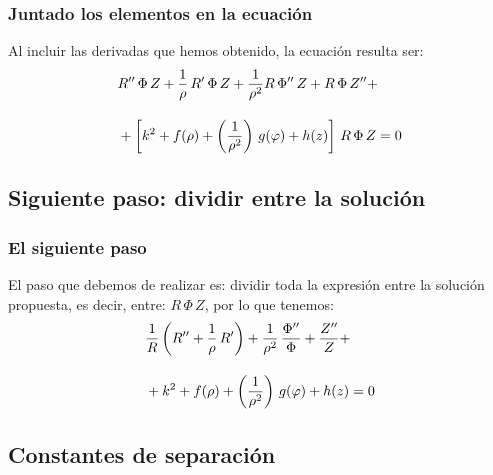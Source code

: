 \documentclass[12pt]{beamer}
\begin{document}
\begin{frame}
\frametitle{Juntado los elementos en la ecuación}
Al incluir las derivadas que hemos obtenido, la ecuación resulta ser:
\begin{align*}
&{} {R}^{\prime \prime} \, \Phi \, Z + \dfrac{1}{\rho} \, {R}^{\prime} \, \Phi \, Z + \dfrac{1}{\rho^{2}} R \, {\Phi}^{\prime \prime} \, Z + R \, \Phi \, {Z}^{\prime \prime} + \\[1em]
&+ \left[ k^{2} + f(\rho) + \left( \dfrac{1}{\rho^{2}} \right) \, g(\varphi) + h(z) \right] \, R \, \Phi \, Z = 0
\end{align*}
\end{frame}

\subsection{Siguiente paso: dividir entre la solución}

\begin{frame}
\frametitle{El siguiente paso}
El paso que debemos de realizar es: dividir toda la expresión entre la solución propuesta, es decir, entre: $R \, \Phi \, Z$, por lo que tenemos:
\pause
\begin{align*}
&{} \dfrac{1}{R} \left( {R}^{\prime \prime} + \dfrac{1}{\rho} \, {R}^{\prime} \right) + \dfrac{1}{\rho^{2}} \, \dfrac{{\Phi}^{\prime \prime}}{\Phi} + \dfrac{{Z}^{\prime \prime}}{Z} + \\[1em]
&+ k^{2} + f(\rho) + \left( \dfrac{1}{\rho^{2}} \right) \, g(\varphi) + h(z) = 0    
\end{align*}
\end{frame}

\subsection{Constantes de separación}
\end{document}
